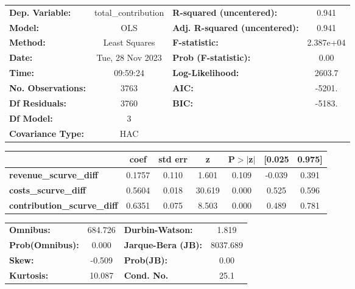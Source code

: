 \begin{center}
\begin{tabular}{lclc}
\toprule
\textbf{Dep. Variable:}             & total\_contribution & \textbf{  R-squared (uncentered):}      &     0.941   \\
\textbf{Model:}                     &         OLS         & \textbf{  Adj. R-squared (uncentered):} &     0.941   \\
\textbf{Method:}                    &    Least Squares    & \textbf{  F-statistic:       }          & 2.387e+04   \\
\textbf{Date:}                      &   Tue, 28 Nov 2023  & \textbf{  Prob (F-statistic):}          &     0.00    \\
\textbf{Time:}                      &       09:59:24      & \textbf{  Log-Likelihood:    }          &    2603.7   \\
\textbf{No. Observations:}          &          3763       & \textbf{  AIC:               }          &    -5201.   \\
\textbf{Df Residuals:}              &          3760       & \textbf{  BIC:               }          &    -5183.   \\
\textbf{Df Model:}                  &             3       & \textbf{                     }          &             \\
\textbf{Covariance Type:}           &         HAC         & \textbf{                     }          &             \\
\bottomrule
\end{tabular}
\begin{tabular}{lcccccc}
                                    & \textbf{coef} & \textbf{std err} & \textbf{z} & \textbf{P$> |$z$|$} & \textbf{[0.025} & \textbf{0.975]}  \\
\midrule
\textbf{revenue\_scurve\_diff}      &       0.1757  &        0.110     &     1.601  &         0.109        &       -0.039    &        0.391     \\
\textbf{costs\_scurve\_diff}        &       0.5604  &        0.018     &    30.619  &         0.000        &        0.525    &        0.596     \\
\textbf{contribution\_scurve\_diff} &       0.6351  &        0.075     &     8.503  &         0.000        &        0.489    &        0.781     \\
\bottomrule
\end{tabular}
\begin{tabular}{lclc}
\textbf{Omnibus:}       & 684.726 & \textbf{  Durbin-Watson:     } &    1.819  \\
\textbf{Prob(Omnibus):} &   0.000 & \textbf{  Jarque-Bera (JB):  } & 8037.689  \\
\textbf{Skew:}          &  -0.509 & \textbf{  Prob(JB):          } &     0.00  \\
\textbf{Kurtosis:}      &  10.087 & \textbf{  Cond. No.          } &     25.1  \\
\bottomrule
\end{tabular}
\end{center}
